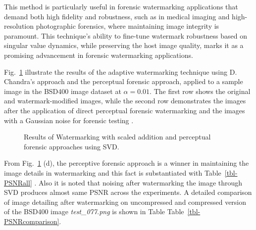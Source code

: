 \documentclass[
  journal,
]{IEEEtran}%
\begin{document}
This method is particularly useful in forensic watermarking applications
that demand both high fidelity and robustness, such as in medical
imaging and high-resolution photographic forensics, where maintaining
image integrity is paramount. This technique's ability to fine-tune
watermark robustness based on singular value dynamics, while preserving
the host image quality, marks it as a promising advancement in forensic
watermarking applications.

Fig.~\ref{fig-perceptualplusscaledaddition} illustrate the results of
the adaptive watermarking technique using D. Chandra's approach and the
perceptual forensic approach, applied to a sample image in the BSD400
image dataset at \(\alpha=0.01\). The first row shows the original and
watermark-modified images, while the second row demonstrates the images
after the application of direct perceptual forensic watermarking and the
images with a Gaussian noise for forensic testing
.

\begin{figure}


\caption{\label{fig-perceptualplusscaledaddition}Results of Watermarking
with scaled addition and perceptual forensic approaches using SVD.}

\end{figure}%

From Fig.~\ref{fig-perceptualplusscaledaddition} (d), the perceptive
forensic approach is a winner in maintaining the image details in
watermarking and this fact is substantiated with Table~\ref{tbl-PSNRall}
. Also it is noted that noising after watermarking the image through SVD
produces almost same PSNR across the experiments. A detailed comparison
of image detailing after watermarking on uncompressed and compressed
version of the BSD400 image \emph{test\_077.png} is shown in Table
Table~\ref{tbl-PSNRcomparison}.
\end{document}
